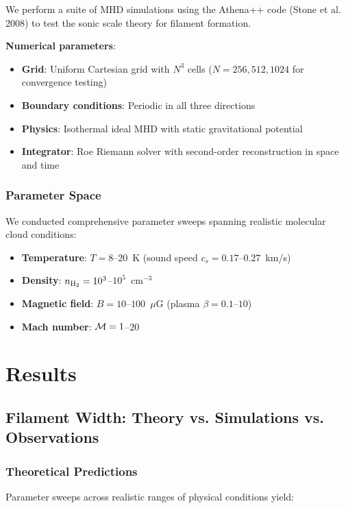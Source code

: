 \documentclass[11pt,a4paper]{article}
\begin{document}
We perform a suite of MHD simulations using the Athena++ code (Stone et al. 2008) to test the sonic scale theory for filament formation.

\textbf{Numerical parameters}:
\begin{itemize}
    \item \textbf{Grid}: Uniform Cartesian grid with $N^3$ cells ($N = 256, 512, 1024$ for convergence testing)
    \item \textbf{Boundary conditions}: Periodic in all three directions
    \item \textbf{Physics}: Isothermal ideal MHD with static gravitational potential
    \item \textbf{Integrator}: Roe Riemann solver with second-order reconstruction in space and time
\end{itemize}

\subsubsection{Parameter Space}

We conducted comprehensive parameter sweeps spanning realistic molecular cloud conditions:
\begin{itemize}
    \item \textbf{Temperature}: $T = 8$--$20$~K (sound speed $c_s = 0.17$--$0.27$~km/s)
    \item \textbf{Density}: $n_{\rm H_2} = 10^3$--$10^5$~cm$^{-3}$
    \item \textbf{Magnetic field}: $B = 10$--$100$~$\mu$G (plasma $\beta = 0.1$--$10$)
    \item \textbf{Mach number}: ${\cal M} = 1$--$20$
\end{itemize}

\section{Results}

\subsection{Filament Width: Theory vs. Simulations vs. Observations}

\subsubsection{Theoretical Predictions}

Parameter sweeps across realistic ranges of physical conditions yield:
\end{document}
